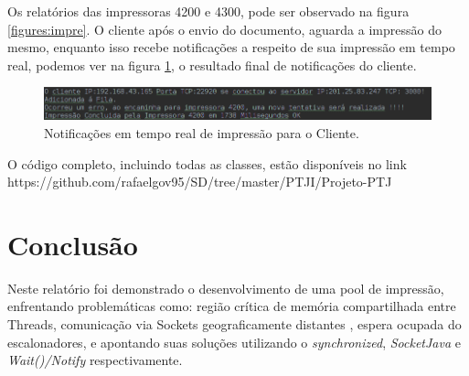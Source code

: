 \documentclass[12pt]{article}
\begin{document}
 
 Os relatórios das impressoras 4200 e 4300, pode ser observado na figura \ref{figures:impre}.
  O cliente após  o envio do documento, aguarda a impressão do mesmo, enquanto isso recebe notificações  a respeito de sua impressão em tempo real, podemos ver  na figura  \ref{fig:screenshot015}, o resultado final de notificações do cliente.
  
  
  \begin{figure}[H]
  	\centering
  	\includegraphics[width=1\linewidth]{imagens/screenshot015}
  	\caption{Notificações em tempo real de impressão para o Cliente.}
  	\label{fig:screenshot015}
  \end{figure}
  O código completo, incluindo todas as classes, estão disponíveis no link https://github.com/rafaelgov95/SD/tree/master/PTJI/Projeto-PTJ
\section{Conclusão}

Neste relatório foi demonstrado o desenvolvimento de uma pool de impressão, enfrentando problemáticas como: região crítica de memória compartilhada entre Threads, comunicação via Sockets geograficamente distantes , espera ocupada do escalonadores, e apontando suas soluções utilizando  o \textit{synchronized}, \textit{SocketJava} e \textit{Wait()/Notify} respectivamente.




\end{document}
